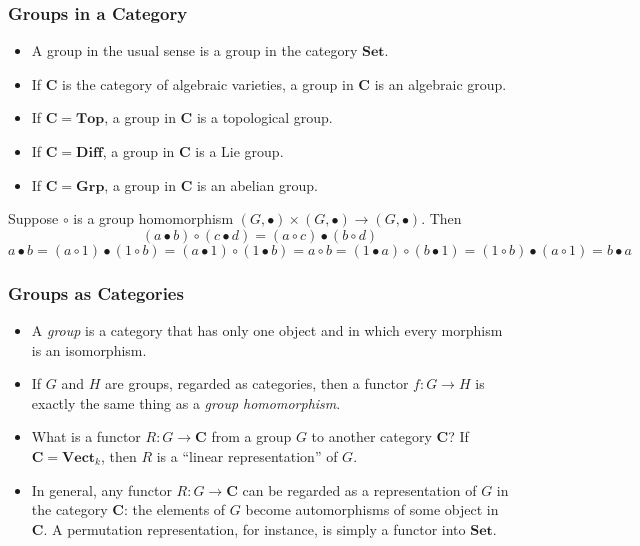 \documentclass[UTF8,11pt,colorlinks,compress,openany]{beamer}%
\begin{document}
\begin{frame}\frametitle{Groups in a Category}
\begin{itemize}
	\item A group in the usual sense is a group in the category $\mathbf{Set}$.
	\item If $\mathbf{C}$ is the category of algebraic varieties, a group in $\mathbf{C}$ is an algebraic group.
	\item If $\mathbf{C}=\mathbf{Top}$, a group in $\mathbf{C}$ is a topological group.
	\item If $\mathbf{C}=\mathbf{Diff}$, a group in $\mathbf{C}$ is a Lie group.
	\item If $\mathbf{C}=\mathbf{Grp}$, a group in $\mathbf{C}$ is an abelian group.
	\end{itemize}\small
Suppose $\circ$ is a group homomorphism $(G,\bullet)\times (G,\bullet)\to (G,\bullet)$. Then
\[(a\bullet b)\circ(c\bullet d)=(a\circ c)\bullet(b\circ d)\]
\[a\bullet b=(a\circ 1)\bullet(1\circ b)=(a\bullet 1)\circ(1\bullet b)=a\circ b=(1\bullet a)\circ(b\bullet 1)=(1\circ b)\bullet(a\circ 1)=b\bullet a\]
\end{frame}

\begin{frame}\frametitle{Groups as Categories}
\begin{itemize}
	\item A \emph{group} is a category that has only one object and in which every morphism is an isomorphism.
	\item If $G$ and $H$ are groups, regarded as categories, then a functor $f: G\to H$ is exactly the same thing as a \emph{group homomorphism}.
	\item What is a functor $R: G\to\mathbf{C}$ from a group $G$ to another category $\mathbf{C}$? If $\mathbf{C}=\mathbf{Vect}_k$, then $R$ is a ``linear representation'' of $G$.
	\item In general, any functor $R: G\to\mathbf{C}$ can be regarded as a representation of $G$ in the category $\mathbf{C}$: the elements of $G$ become automorphisms of some object in $\mathbf{C}$. A permutation representation, for instance, is simply a functor into $\mathbf{Set}$.
\end{itemize}
\end{frame}
\end{document}
